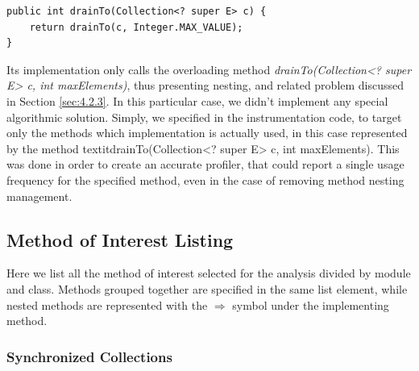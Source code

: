 \documentclass[]{usiinfthesis}
\begin{document}
\begin{verbatim}
public int drainTo(Collection<? super E> c) {
    return drainTo(c, Integer.MAX_VALUE);
}
\end{verbatim}
 
 \noindent
 Its implementation only calls the overloading method \textit{drainTo(Collection<? super E> c, int maxElements)}, thus presenting nesting, and related problem discussed in Section \ref{sec:4.2.3}. In this particular case, we didn't implement any special algorithmic solution. Simply, we specified in the instrumentation code, to target only the methods which implementation is actually used, in this case represented by the method textit{drainTo(Collection<? super E> c, int maxElements)}. This was done in order to create an accurate profiler, that could report a single usage frequency for the specified method, even in the case of removing method nesting management.
 
 \subsection{Method of Interest Listing} \label{sec:4.2.5}
 Here we list all the method of interest selected for the analysis divided by module and class. Methods grouped together are specified in the same list element, while nested methods are represented with the $\Rightarrow$ symbol under the implementing method.
 
\subsubsection{Synchronized Collections}
\end{document}
